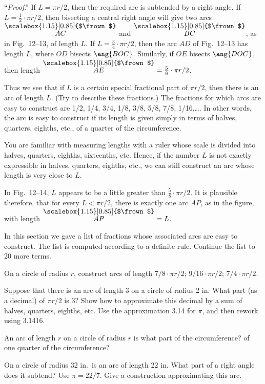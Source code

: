\documentclass[11pt]{book}
\theoremstyle{bkplain}
\theoremstyle{XIplainnote}
\theoremstyle{bkplain}
\newcommand{\XIIarc}[1]{\overset{\raisebox{-0.25ex}{\scalebox{1.15}[0.85]{$\frown$}}}{#1}}
\theoremstyle{bkplain}
\begin{document}
\noindent``\emph{Proof}.'' If $L = \pi r/2$, then the required arc is subtended
by a right angle. If $L = \frac{1}{2} \cdot \pi r/2$, then bisecting a central
right angle will give two arcs $\XIIarc{AC}$ and $\XIIarc{BC}$, as in
Fig.~12--13, of length $L$. If $L = \frac{3}{4} \cdot \pi r/2$, then the arc
$AD$ of Fig.~12--13 has length $L$, where $OD$ bisects $\ang{BOC}$. Similarly,
if $OE$ bisects $\ang{DOC}$, then length $\XIIarc{AE} = \frac{5}{8} \cdot
\pi r/2$.

Thus we see that if $L$ is a certain special fractional part of $\pi r/2$, then
there is an arc of length $L$. (Try to describe these fractions.) The fractions
for which arcs are easy to construct are 1/2, 1/4, 3/4, 1/8, 3/8, 5/8, 7/8,
1/16,\ldots. In other words, the arc is easy to construct if its length is given
simply in terms of halves, quarters, eighths, etc., of a quarter of the
circumference.

\FIGXIITHIRTEENFOURTEEN

You are familiar with measuring lengths with a ruler whose scale is divided into
halves, quarters, eighths, sixteenths, etc. Hence, if the number $L$ is not
exactly expressible in halves, quarters, eighths, etc., we can still construct
an arc whose length is very close to $L$.

In Fig.~12--14, $L$ appears to be a little greater than $\frac{5}{8} \cdot
\pi r/2$. It is plausible therefore, that for every $L < \pi r/2$, there is
exactly one arc $AP$, as in the figure, with length $\XIIarc{AP} = L$.

\begin{exercisecols}
\begin{exlist}
\item In this section we gave a list of fractions whose associated arcs are easy
      to construct. The list is computed according to a definite rule. Continue
      the list to 20 more terms.
\item On a circle of radius $r$, construct arcs of length
      $7/8 \cdot \pi r/2$; $9/16 \cdot \pi r/2$; $7/4 \cdot \pi r/2$.
\item Suppose that there is an arc of length 3 on a circle of radius 2 in. What
      part (as a decimal) of $\pi r/2$ is 3? Show how to approximate this
      decimal by a sum of halves, quarters, eighths, etc. Use the approximation
      3.14 for $\pi$, and then rework using 3.1416.
\item An arc of length $r$ on a circle of radius $r$ is what part of the
      circumference? of one quarter of the circumference?
\item On a circle of radius 32 in.\ is an arc of length 22 in. What part of a
      right angle does it subtend? Use $\pi = 22/7$. Give a construction
      approximating this arc.
\end{exlist}
\end{exercisecols}
\end{document}
